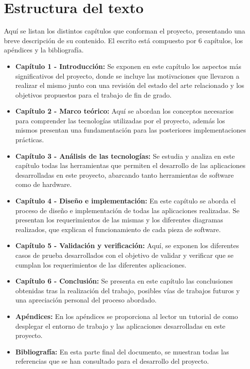 \section{Estructura del texto}

Aquí se listan los distintos capítulos que conforman el proyecto, presentando una breve descripción de su contenido. El escrito está compuesto por 6 capítulos, los apéndices y la bibliografía.


\begin{itemize}   
    \item \textbf{Capítulo 1 - Introducción:} Se exponen en este capítulo los aspectos más significativos del proyecto, donde se incluye las motivaciones que llevaron a realizar el mismo junto con una revisión del estado del arte relacionado y los objetivos propuestos para el trabajo de fin de grado.

    \item \textbf{Capítulo 2 - Marco teórico:} Aquí se abordan los conceptos necesarios para comprender las tecnologías utilizadas por el proyecto, además los mismos presentan una fundamentación para las posteriores implementaciones prácticas.

    \item \textbf{Capítulo 3 - Análisis de las tecnologías:} Se estudia y analiza en este capítulo todas las herramientas que permiten el desarrollo de las aplicaciones desarrolladas en este proyecto, abarcando tanto herramientas de software como de hardware.

    \item \textbf{Capítulo 4 - Diseño e implementación:} En este capítulo se aborda el proceso de diseño e implementación de todas las aplicaciones realizadas. Se presentan los requerimientos de las mismas y los diferentes diagramas realizados, que explican el funcionamiento de cada pieza de software. 

    \item \textbf{Capítulo 5 - Validación y verificación:} Aquí, se exponen los diferentes casos de prueba desarrollados con el objetivo de validar y verificar que se cumplan los requerimientos de las diferentes aplicaciones.

    \item \textbf{Capítulo 6 - Conclusión:} Se presenta en este capítulo las conclusiones obtenidas tras la realización del trabajo, posibles vías de trabajos futuros y una apreciación personal del proceso abordado.
	
	\item \textbf{Apéndices:} En los apéndices se proporciona al lector un tutorial de como desplegar el entorno de trabajo y las aplicaciones desarrolladas en este proyecto.
    
    \item \textbf{Bibliografía:} En esta parte final del documento, se muestran todas las referencias que se han consultado para el desarrollo del proyecto.   
\end{itemize}

